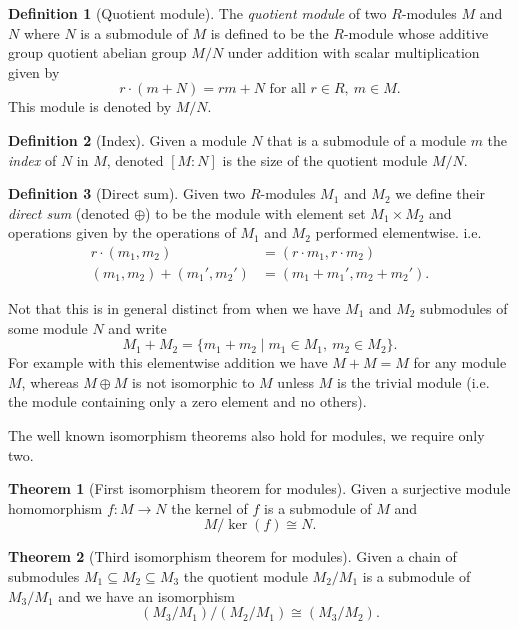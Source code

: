 \documentclass[12pt,a4paper,abstracton,bibtotoc]{scrreprt}
\theoremstyle{definition}
\newtheorem{thm}{Theorem}
\newtheorem{defn}{Definition}
\begin{document}
\begin{defn}[Quotient module]
The \emph{quotient module} of two $R$-modules $M$ and $N$ where $N$ is a submodule of $M$ is defined to be the $R$-module whose additive group quotient abelian group $M/N$ under addition with scalar multiplication given by
\[
r\cdot(m + N) = rm + N\text{ for all }r\in R,\ m\in M.
\]
This module is denoted by $M/N$.
\end{defn}

\begin{defn}[Index]
Given a module $N$ that is a submodule of a module $m$ the \emph{index} of $N$ in $M$, denoted $[M:N]$ is the size of the quotient module $M / N$.
\end{defn}

\begin{defn}[Direct sum]
Given two $R$-modules $M_1$ and $M_2$ we define their \emph{direct sum} (denoted $\oplus$) to be the module with element set $M_1 \times M_2$ and operations given by the operations of $M_1$ and $M_2$ performed elementwise. i.e.
\begin{align*}
r\cdot(m_1,m_2) &= (r\cdot m_1, r\cdot m_2)\\
(m_1,m_2) + (m_1',m_2') &= (m_1 + m_1',m_2+m_2').
\end{align*}
\end{defn}

Not that this is in general distinct from when we have $M_1$ and $M_2$ submodules of some module $N$ and write
\[
M_1 + M_2 = \{m_1 + m_2 \mid m_1\in M_1,\ m_2\in M_2\}.
\]
For example with this elementwise addition we have $M + M = M$ for any module $M$, whereas $M\oplus M$ is not isomorphic to $M$ unless $M$ is the trivial module (i.e. the module containing only a zero element and no others).

The well known isomorphism theorems also hold for modules, we require only two.

\begin{thm}[First isomorphism theorem for modules]
Given a surjective module homomorphism $f\colon M \to N$ the kernel of $f$ is a submodule of $M$ and
\[
M/\ker(f) \cong N.
\]
\end{thm}

\begin{thm}[Third isomorphism theorem for modules]
Given a chain of submodules $M_1 \subseteq M_2 \subseteq M_3$ the quotient module $M_2/M_1$ is a submodule of $M_3/M_1$ and we have an isomorphism
\[
(M_3/M_1)/(M_2/M_1) \cong (M_3/M_2).
\]
\end{thm}
\end{document}
